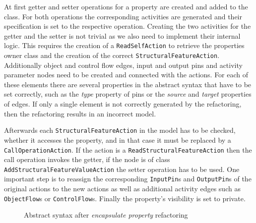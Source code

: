 \documentclass{llncs}
\begin{document}
At first 
getter and setter operations for a property are created and
added to the class. For both operations the corresponding activities are generated and their specification is set to the 
respective operation.
Creating the two activities for the getter and the setter is not trivial as we also need to implement their internal logic. This requires 
the creation of
a \texttt{Read\-Self\-Action} to retrieve the properties owner class and the creation of the correct \texttt{Structural\-Feature\-Action}.
Additionally object and control flow edges, input and output pins and activity parameter nodes need to be created and connected with the 
actions. For each of these elements there are several properties in the abstract syntax that have to be set correctly, such as the 
\textit{type} property of pins or the \textit{source} and \textit{target} properties of edges. If only a single element is not correctly 
generated by the refactoring, then the refactoring results in an incorrect model.

Afterwards each \texttt{Structural\-Feature\-Action} in the model has to be checked, whether it accesses 
the property, and in that case it must be replaced by a \texttt{Call\-Operation\-Action}. If the action is a 
\texttt{Read\-Structural\-Feature\-Action} then the call operation invokes the getter, if the node is of class 
\texttt{Add\-Structural\-Feature\-Value\-Action} the setter operation has to be used. 
One important step is to reassign the corresponding \texttt{InputPin}s and \texttt{OutputPin}s of the original 
actions to the new actions as well as additional activity edges such as \texttt{ObjectFlow}s or \texttt{ControlFlow}s.
Finally the property's visibility is set to private.

\begin{figure}
 \caption{Abstract syntax after \textit{encapsulate property} refactoring}
 \label{fig:encapsulateafter}
\end{figure}
\end{document}
